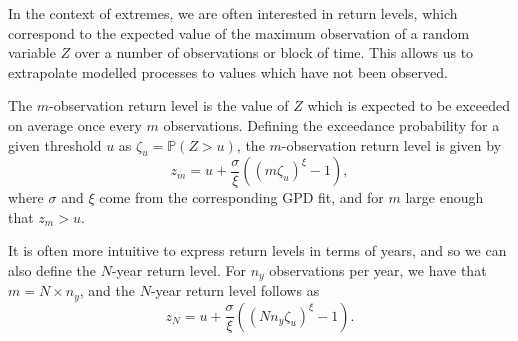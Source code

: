 \documentclass{article}
\numberwithin{equation}{section}
\begin{document}


In the context of extremes, we are often interested in return levels, which correspond to the expected value of the maximum observation of a random variable $Z$ over a number of observations or block of time.
This allows us to extrapolate modelled processes to values which have not been observed. %

The $m$-observation return level is the value of $Z$ which is expected to be exceeded on average once every $m$ observations.
Defining the exceedance probability for a given threshold $u$ as $\zeta_u = \mathbb{P}(Z > u)$, the $m$-observation return level is given by
\begin{equation} \label{eq:m_obs_return}
  z_m = u + \frac{\sigma}{\xi}\left(\left(m \zeta_u \right)^{\xi} - 1\right),
\end{equation}
where $\sigma$ and $\xi$ come from the corresponding GPD fit, and for $m$ large enough that $z_m > u$. 

It is often more intuitive to express return levels in terms of years, and so we can also define the $N$-year return level.
For $n_y$ observations per year, we have that $m = N \times n_y$, and the $N$-year return level follows as
\begin{equation} \label{eq:n_year_return}
  z_N = u + \frac{\sigma}{\xi}\left(\left(N n_y \zeta_u \right)^{\xi} - 1\right). 
\end{equation}
\end{document}
